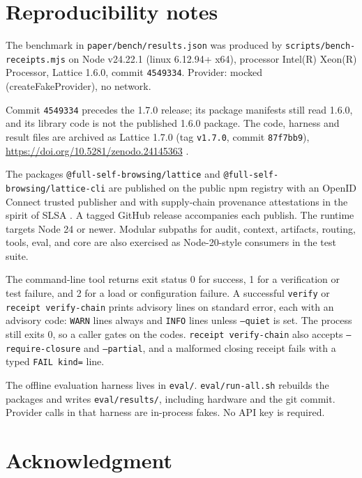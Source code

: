 \documentclass[conference]{IEEEtran}
\newcommand{\code}[1]{\texttt{\small #1}}
\begin{document}
\section{Reproducibility notes}
\label{app:repro}

The benchmark in \code{paper/bench/results.json} was produced by \code{scripts/bench-receipts.mjs} on Node v24.22.1 (linux 6.12.94+ x64), processor Intel(R) Xeon(R) Processor, Lattice 1.6.0, commit \code{4549334}. Provider: mocked (createFakeProvider), no network.

Commit \code{4549334} precedes the 1.7.0 release; its package manifests still read 1.6.0, and its library code is not the published 1.6.0 package. The code, harness and result files are archived as Lattice 1.7.0 (tag \code{v1.7.0}, commit \code{87f7bb9}), \url{https://doi.org/10.5281/zenodo.24145363} \cite{lattice}.

The packages \code{@full-self-browsing/lattice} and \code{@full-self-browsing/lattice-cli} are published on the public npm registry with an OpenID Connect trusted publisher and with supply-chain provenance attestations in the spirit of SLSA \cite{slsa}. A tagged GitHub release accompanies each publish. The runtime targets Node 24 or newer. Modular subpaths for audit, context, artifacts, routing, tools, eval, and core are also exercised as Node-20-style consumers in the test suite.

The command-line tool returns exit status 0 for success, 1 for a verification or test failure, and 2 for a load or configuration failure. A successful \code{verify} or \code{receipt verify-chain} prints advisory lines on standard error, each with an advisory code: \code{WARN} lines always and \code{INFO} lines unless \code{--quiet} is set. The process still exits 0, so a caller gates on the codes. \code{receipt verify-chain} also accepts \code{--require-closure} and \code{--partial}, and a malformed closing receipt fails with a typed \code{FAIL kind=} line.

The offline evaluation harness lives in \code{eval/}. \code{eval/run-all.sh} rebuilds the packages and writes \code{eval/results/}, including hardware and the git commit. Provider calls in that harness are in-process fakes. No API key is required.

\section*{Acknowledgment}
\end{document}
